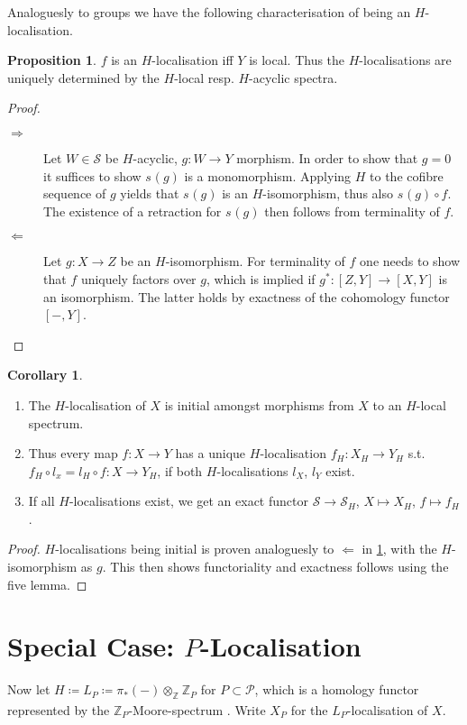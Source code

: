 \documentclass[english]{scrartcl}
\theoremstyle{definition}
\newtheorem*{Prop}{Proposition}
\newtheorem*{Cor}{Corollary}
\theoremstyle{remark}
\newcommand*{\ifftext}{iff}
\newcommand*{\Z}[1][]{\mathds{Z}_{#1}}  %
\newcommand*{\Spectra}{\mathcal{S}} %
\newcommand*{\conem}[2][]{s^{#1}(#2)}  %
\newcommand*{\Ps}{P}  %
\newcommand*{\PS}{\mathcal{P}} %
\newcommand*{\Hiso}{$H$-isomorphism}  %
\newcommand*{\pistar}[2][*]{\pi_{#1}(#2)}  %
\newcommand*{\timesZ}[1][\Ps]{\otimes_{\Z} \Z[#1]}  %
\newcommand*{\LP}[1][\Ps]{L_{#1}}  %
\begin{document}
Analoguesly to groups we have the following characterisation of being
an $H$-localisation.
\begin{Prop}\label{thm:charhlocal}
  $f$ is an $H$-localisation \ifftext{} $Y$ is local.
  Thus the $H$-localisations are uniquely determined by the $H$-local
  resp. $H$-acyclic spectra.
  \begin{proof}
    \begin{description}
    \item[$\Rightarrow$]
      Let $W\in\Spectra$ be $H$-acyclic, $g\colon W\to Y$ morphism. In
      order to show that $g=0$ it suffices to show $\conem g$ is a
      monomorphism. Applying $H$ to the cofibre sequence of $g$ yields
      that $\conem g$ is an \Hiso, thus also $\conem g \circ f$.
      The existence of a retraction for $\conem g$ then follows from
      terminality of $f$.
    \item[$\Leftarrow$]
      Let $g\colon X\to Z$ be an \Hiso. For terminality of $f$ one
      needs to show that $f$ uniquely factors over $g$, which is
      implied if $g^*\colon [Z,Y]\to [X,Y]$ is an isomorphism.
      The latter holds by exactness of the cohomology functor
      $[-,Y]$.
    \end{description}
  \end{proof}
\end{Prop}
\begin{Cor}
  \begin{enumerate}
  \item The $H$-localisation of $X$ is initial amongst morphisms
    from $X$ to an $H$-local spectrum.
  \item Thus every map $f\colon X\to Y$ has a unique $H$-localisation
    $f_H\colon X_H\to Y_H$ s.t.
    $f_H\circ l_x = l_H\circ f\colon X\to Y_H$,
    if both $H$-localisations $l_X$, $l_Y$ exist.
  \item If all $H$-localisations exist, we get an exact functor
    $\Spectra\to \Spectra_H$, $X\mapsto X_H$, $f\mapsto f_H$.
  \end{enumerate}
  \begin{proof}
    $H$-localisations being initial is proven analoguesly to
    $\Leftarrow$ in \ref{thm:charhlocal}, with the \Hiso{} as $g$.
    This then shows functoriality and exactness follows using the five lemma.
  \end{proof}
\end{Cor}

\section{Special Case: $\Ps$-Localisation}
Now let $H\coloneqq \LP\coloneqq \pistar{-}\timesZ$ for $\Ps\subset\PS$, which is a homology
functor represented by the $\Z[\Ps]$-Moore-spectrum \cite[p.\,111,
Exc. (a)]{margolis}.
Write $X_{\Ps}$ for the $\LP$-localisation of $X$.
\end{document}
